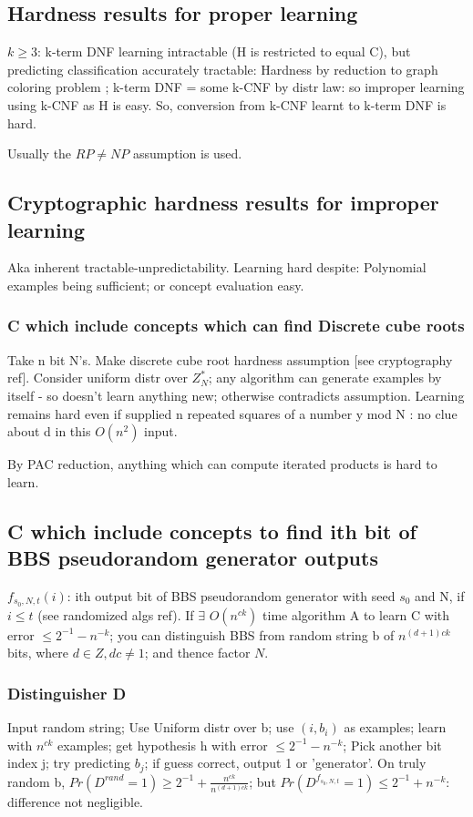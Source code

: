 \documentclass[oneside, article]{memoir}
\begin{document}
\subsection{Hardness results for proper learning}
$k \geq 3$: k-term DNF learning intractable (H is restricted to equal C), but predicting classification accurately tractable: Hardness by reduction to graph coloring problem \why; k-term DNF = some k-CNF by distr law: so improper learning using k-CNF as H is easy. So, conversion from k-CNF learnt to k-term DNF is hard.

Usually the $RP \neq NP$ assumption is used.

\subsection{Cryptographic hardness results for improper learning}
Aka inherent tractable-unpredictability. Learning hard despite: Polynomial examples being sufficient; or concept evaluation easy.

\subsubsection{C which include concepts which can find Discrete cube roots}
Take n bit N's. Make discrete cube root hardness assumption [see cryptography ref]. Consider uniform distr over $Z^{*}_{N}$; any algorithm can generate examples by itself - so doesn't learn anything new; otherwise contradicts assumption. Learning remains hard even if supplied n repeated squares of a number y mod N : no clue about d in this $O(n^{2})$ input.

By PAC reduction, anything which can compute iterated products is hard to learn.

\subsection{C which include concepts to find ith bit of BBS pseudorandom generator outputs}
$f_{s_{0}, N, t}(i)$: ith output bit of BBS pseudorandom generator with seed $s_{0}$ and N, if $i \leq t$ (see randomized algs ref). If $\exists$ $O(n^{ck})$ time algorithm A to learn C with error $\leq 2^{-1} - n^{-k}$; you can distinguish BBS from random string b of $n^{(d+1)ck}$ bits, where $d\in Z, dc\neq 1$; and thence factor $N$.

\subsubsection{Distinguisher D}
Input random string; Use Uniform distr over b; use $(i, b_{i})$ as examples; learn with $n^{ck}$ examples; get hypothesis h with error $\leq 2^{-1} - n^{-k}$; Pick another bit index j; try predicting $b_{j}$; if guess correct, output 1 or 'generator'. On truly random b, $Pr(D^{rand} = 1)\geq 2^{-1} + \frac{n^{ck}}{n^{(d+1)ck}}$; but $Pr(D^{f_{s_{0}, N, t}} = 1) \leq 2^{-1} + n^{-k}$: difference not negligible.
\end{document}
